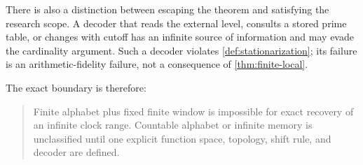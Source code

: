 There is also a distinction between escaping the theorem and satisfying the
research scope.  A decoder that reads the external level, consults a stored
prime table, or changes with cutoff has an infinite source of information and
may evade the cardinality argument.  Such a decoder violates
\cref{def:stationarization}; its failure is an arithmetic-fidelity failure,
not a consequence of \cref{thm:finite-local}.

The exact boundary is therefore:
\begin{quote}
Finite alphabet plus fixed finite window is impossible for exact recovery of
an infinite clock range.  Countable alphabet or infinite memory is
unclassified until one explicit function space, topology, shift rule, and
decoder are defined.
\end{quote}
